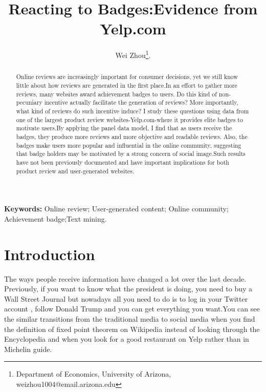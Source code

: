 \documentclass[12pt]{article}%
\begin{document}
\title{Reacting to Badges:Evidence from Yelp.com}
\author{Wei Zhou\thanks{Department of Economics, University of Arizona, 
weizhou1004@email.arizona.edu}.    }
\maketitle

\sloppy%

\onehalfspacing

\begin{abstract}
Online reviews are increasingly important for consumer decisions, yet we still know little about how reviews are generated in the first place.In an effort to gather more reviews, many websites award achievement badges to users. Do this kind of non-pecuniary incentive actually facilitate the generation of reviews? More importantly, what kind of reviews do such incentive induce? I study these questions using data from one of the largest product review websites-Yelp.com-where it provides elite badges to motivate users.By applying the panel data model, I find that as users receive the badges, they produce more reviews and more objective and readable reviews. Also, the badges make users more popular and influential in the online community, suggesting that badge holders may be motivated by a strong concern of social image.Such results have not been previously documented and have important implications for both product review and user-generated websites.


\end{abstract}

\strut

\textbf{Keywords:} Online review; User-generated content; Online community; Achievement badge;Text mining.

\strut



\pagebreak%
\doublespacing %


\section{Introduction}
\label{intro} %

The ways people receive information have changed a lot over the last decade. Previously, if you want to know what the president is doing, you need to buy a Wall Street Journal but nowadays all you need to do is to log in your Twitter account , follow Donald Trump and you can get everything you want.You can see the similar transitions from the traditional media to social media when you find the definition of fixed point theorem on Wikipedia instead of looking through the Encyclopedia and when you look for a good restaurant on Yelp rather than in Michelin guide.
\end{document}
